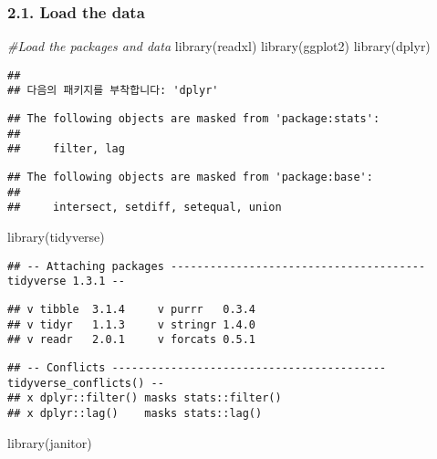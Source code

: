 \documentclass[
]{article}
\newenvironment{Shaded}{\begin{snugshade}}{\end{snugshade}}
\newcommand{\CommentTok}[1]{\textcolor[rgb]{0.56,0.35,0.01}{\textit{#1}}}
\newcommand{\FunctionTok}[1]{\textcolor[rgb]{0.00,0.00,0.00}{#1}}
\newcommand{\NormalTok}[1]{#1}
\begin{document}
\hypertarget{load-the-data}{%
\subsubsection{2.1. Load the data}\label{load-the-data}}

\begin{Shaded}
\begin{Highlighting}[]
\CommentTok{\#Load the packages and data}
\FunctionTok{library}\NormalTok{(readxl)}
\FunctionTok{library}\NormalTok{(ggplot2)}
\FunctionTok{library}\NormalTok{(dplyr)}
\end{Highlighting}
\end{Shaded}

\begin{verbatim}
## 
## 다음의 패키지를 부착합니다: 'dplyr'
\end{verbatim}

\begin{verbatim}
## The following objects are masked from 'package:stats':
## 
##     filter, lag
\end{verbatim}

\begin{verbatim}
## The following objects are masked from 'package:base':
## 
##     intersect, setdiff, setequal, union
\end{verbatim}

\begin{Shaded}
\begin{Highlighting}[]
\FunctionTok{library}\NormalTok{(tidyverse)}
\end{Highlighting}
\end{Shaded}

\begin{verbatim}
## -- Attaching packages --------------------------------------- tidyverse 1.3.1 --
\end{verbatim}

\begin{verbatim}
## v tibble  3.1.4     v purrr   0.3.4
## v tidyr   1.1.3     v stringr 1.4.0
## v readr   2.0.1     v forcats 0.5.1
\end{verbatim}

\begin{verbatim}
## -- Conflicts ------------------------------------------ tidyverse_conflicts() --
## x dplyr::filter() masks stats::filter()
## x dplyr::lag()    masks stats::lag()
\end{verbatim}

\begin{Shaded}
\begin{Highlighting}[]
\FunctionTok{library}\NormalTok{(janitor)}
\end{Highlighting}
\end{Shaded}
\end{document}
